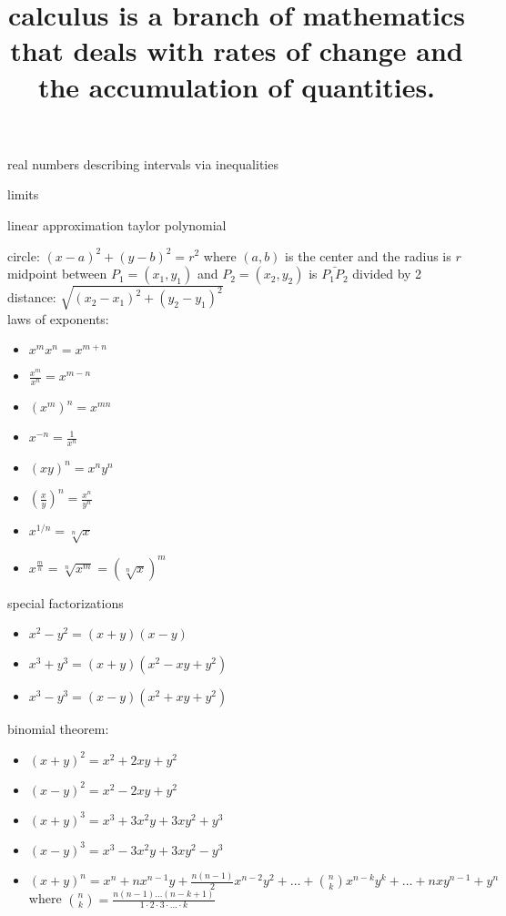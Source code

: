\documentclass{article}
\begin{document}
\title{calculus is a branch of mathematics that deals with rates of change and the accumulation of quantities.}
\maketitle

real numbers
describing intervals via inequalities

limits

linear approximation
taylor polynomial

circle: $(x-a)^2 + (y-b)^2 = r^2$ where $(a, b)$ is the center and the radius is $r$\\

midpoint between $P_1 = (x_1, y_1)$ and $P_2 = (x_2, y_2)$ is $\bar{P_{1}P_2}$ divided by 2\\

distance: $\sqrt{(x_2 - x_1)^2 + (y_2 - y_1)^2}$\\

laws of exponents: 

	\begin{itemize}
		\item $x^mx^n = x^{m+n}$
		\item $\frac{x^m}{x^n} = x^{m-n}$
		\item $(x^m)^n = x^{mn}$
		\item $x^{-n} = \frac{1}{x^n}$
		\item $(xy)^n = x^ny^n$
		\item $(\frac{x}{y})^n = \frac{x^n}{y^n}$
		\item $x^{1/n} = \sqrt[n]{x}$
		\item $x^{\frac{m}{n}} = \sqrt[n]{x^m} = (\sqrt[n]{x})^m$
	\end{itemize}

special factorizations

	\begin{itemize}
		\item $x^2 - y^2 = (x + y)(x - y)$
		\item $x^3 + y^3 = (x + y)(x^2 - xy + y^2)$
		\item $x^3 - y^3 = (x - y)(x^2 + xy + y^2)$
	\end{itemize}

binomial theorem:

	\begin{itemize}
		\item $(x + y)^2 = x^2 + 2xy + y^2$
		\item $(x - y)^2 = x^2 - 2xy + y^2$
		\item $(x + y)^3 = x^3 + 3x^2y + 3xy^2 + y^3$
		\item $(x - y)^3 = x^3 - 3x^2y + 3xy^2 - y^3$
		\item $(x + y)^n = x^n + nx^{n-1}y + \frac{n(n-1)}{2}x^{n-2}y^2 + \ldots + \binom{n}{k}x^{n-k}y^k + \dots + nxy^{n-1} + y^n$
			where $\binom{n}{k} = \frac{n(n-1) \dots (n-k+1)}{1 \cdot 2 \cdot 3 \cdot \ldots \cdot k}$
	\end{itemize}
\end{document}
